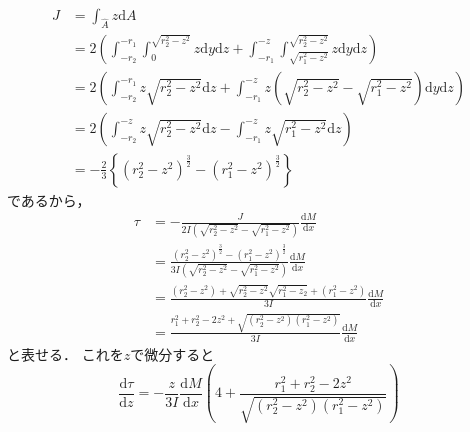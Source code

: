 \documentclass[a4paper]{jsarticle}
\begin{document}
\subsubsection{}
\begin{equation}
  \label{eq:first_moment}
  \begin{aligned}
    J & = \int_{\hat{A}} z \mathrm{d} A                        \\
      & = 2\left(
    \int_{-r_2}^{-r_1} \int_{0}^{\sqrt{r_2^2 - z^2}}
    z \mathrm{d} y \mathrm{d} z +
    \int_{-r_1}^{-z} \int_{\sqrt{r_1^2 - z^2}}^{\sqrt{r_2^2 - z^2}}
    z \mathrm{d} y \mathrm{d} z \right)                        \\
      & = 2 \left(
    \int_{-r_2}^{-r_1} z \sqrt{r_2^2 - z^2} \mathrm{d} z +
    \int_{-r_1}^{-z} z \left(\sqrt{r_2^2 - z^2} - \sqrt{r_1^2 - z^2}\right)
    \mathrm{d} y \mathrm{d} z \right)                          \\
      & = 2 \left(
    \int_{-r_2}^{-z} z \sqrt{r_2^2 - z^2} \mathrm{d} z -
    \int_{-r_1}^{-z} z \sqrt{r_1^2 - z^2} \mathrm{d} z \right) \\
      & = -\frac{2}{3}
    \left\{(r_2^2 - z^2)^{\frac{3}{2}} -
    (r_1^2 - z^2)^{\frac{3}{2}}\right\}
  \end{aligned}
\end{equation}
であるから，
\begin{equation}
  \begin{aligned}
    \tau & = -\frac{J}{2 I (\sqrt{r_2^2 - z^2} - \sqrt{r_1^2 - z^2})}
    \frac{\mathrm{d} M}{\mathrm{d} x}                                             \\
         & = \frac{(r_2^2 - z^2)^{\frac{3}{2}} - (r_1^2 - z^2)^{\frac{3}{2}}}
    {3 I (\sqrt{r_2^2 - z^2} - \sqrt{r_1^2 - z^2})}
    \frac{\mathrm{d} M}{\mathrm{d} x}                                             \\
         & = \frac{(r_2^2 - z^2) + \sqrt{r_2^2 - z^2} \sqrt{r_1^2 - z_2} +
      (r_1^2 - z^2)}
    {3I} \frac{\mathrm{d} M}{\mathrm{d} x}                                        \\
         & = \frac{r_1^2 + r_2^2 - 2 z^2 + \sqrt{(r_2^2 - z^2)(r_1^2 - z^2)}}{3I}
    \frac{\mathrm{d} M}{\mathrm{d} x}
  \end{aligned}
\end{equation}
と表せる．
これを$z$で微分すると
\begin{equation}
  \frac{\mathrm{d} \tau}{\mathrm{d} z} =
  -\frac{z}{3I} \frac{\mathrm{d} M}{\mathrm{d} x}
  \left(4 + \frac{r_1^2 + r_2^2 - 2z^2}{\sqrt{(r_2^2 - z^2)(r_1^2 - z^2)}}\right)
\end{equation}
\end{document}
